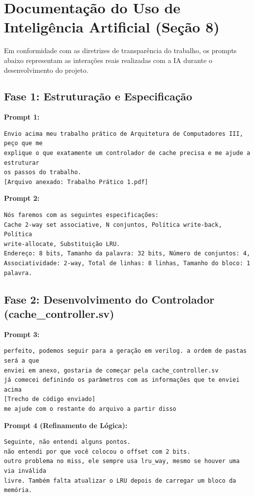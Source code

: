 ﻿\documentclass[12pt,a4paper]{article}
\begin{document}
\section{Documentação do Uso de Inteligência Artificial (Seção 8)}
\label{sec:ia_documentation}

Em conformidade com as diretrizes de transparência do trabalho, os prompts abaixo representam as interações reais realizadas com a IA durante o desenvolvimento do projeto.

\subsection{Fase 1: Estruturação e Especificação}
\textbf{Prompt 1:}
\begin{verbatim}
Envio acima meu trabalho prático de Arquitetura de Computadores III, peço que me 
explique o que exatamente um controlador de cache precisa e me ajude a estruturar 
os passos do trabalho.
[Arquivo anexado: Trabalho Prático 1.pdf]
\end{verbatim}

\textbf{Prompt 2:}
\begin{verbatim}
Nós faremos com as seguintes especificações:
Cache 2-way set associative, N conjuntos, Política write-back, Política 
write-allocate, Substituição LRU.
Endereço: 8 bits, Tamanho da palavra: 32 bits, Número de conjuntos: 4, 
Associatividade: 2-way, Total de linhas: 8 linhas, Tamanho do bloco: 1 palavra.
\end{verbatim}

\subsection{Fase 2: Desenvolvimento do Controlador (cache\_controller.sv)}
\textbf{Prompt 3:}
\begin{verbatim}
perfeito, podemos seguir para a geração em verilog. a ordem de pastas será a que 
enviei em anexo, gostaria de começar pela cache_controller.sv
já comecei definindo os parâmetros com as informações que te enviei acima
[Trecho de código enviado]
me ajude com o restante do arquivo a partir disso
\end{verbatim}

\textbf{Prompt 4 (Refinamento de Lógica):}
\begin{verbatim}
Seguinte, não entendi alguns pontos.
não entendi por que você colocou o offset com 2 bits.
outro problema no miss, ele sempre usa lru_way, mesmo se houver uma via inválida 
livre. Também falta atualizar o LRU depois de carregar um bloco da memória.
\end{verbatim}
\end{document}
